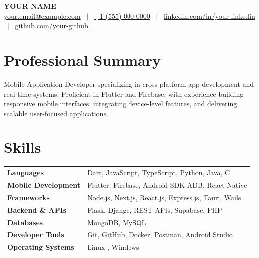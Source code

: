 \documentclass[a4paper,10pt]{article}
\begin{document}
\pagestyle{empty}

\begin{center}
{\LARGE \textbf{YOUR NAME}}\\[3pt]
\href{mailto:your.email@example.com}{your.email@example.com}
~$|$~
\href{tel:+910000085302}{+1 (555) 000-0000}
~$|$~
\href{https://www.linkedin.com/in/your-linkedin/}{linkedin.com/in/your-linkedin}
~$|$~
\href{https://github.com/your-github}{github.com/your-github}
\end{center}

\vspace{-5pt}

\section*{Professional Summary}

Mobile Application Developer specializing in cross-platform app development and real-time systems. Proficient in Flutter and Firebase, with experience building responsive mobile interfaces, integrating device-level features, and delivering scalable user-focused applications.

\section*{Skills}

\renewcommand{\arraystretch}{1.05}
\begin{tabular}{@{} >{\bfseries}p{3.8cm} p{13cm} @{}}
Languages           & Dart, JavaScript, TypeScript, Python, Java, C \\
Mobile Development  & Flutter, Firebase, Android SDK ADB, React Native \\
Frameworks          & Node.js, Next.js, React.js, Express.js, Tauri, Wails \\
Backend \& APIs     & Flask, Django, REST APIs, Supabase, PHP \\
Databases           & MongoDB, MySQL \\
Developer Tools     & Git, GitHub, Docker, Postman, Android Studio \\
Operating Systems   & Linux , Windows \\
\end{tabular}
\end{document}
